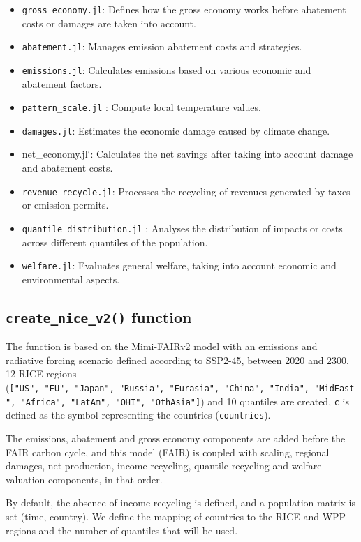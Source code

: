 \documentclass[
]{article}
\begin{document}
\begin{itemize}
\item
  \texttt{gross\_economy.jl}: Defines how the gross economy works before
  abatement costs or damages are taken into account.
\item
  \texttt{abatement.jl}: Manages emission abatement costs and
  strategies.
\item
  \texttt{emissions.jl}: Calculates emissions based on various economic
  and abatement factors.
\item
  \texttt{pattern\_scale.jl} : Compute local temperature values.
\item
  \texttt{damages.jl}: Estimates the economic damage caused by climate
  change.
\item
  net\_economy.jl`: Calculates the net savings after taking into account
  damage and abatement costs.
\item
  \texttt{revenue\_recycle.jl}: Processes the recycling of revenues
  generated by taxes or emission permits.
\item
  \texttt{quantile\_distribution.jl} : Analyses the distribution of
  impacts or costs across different quantiles of the population.
\item
  \texttt{welfare.jl}: Evaluates general welfare, taking into account
  economic and environmental aspects.
\end{itemize}

\subsection{\texorpdfstring{\texttt{create\_nice\_v2()}
function}{create\_nice\_v2() function}}\label{create_nice_v2-function}

The function is based on the Mimi-FAIRv2 model with an emissions and
radiative forcing scenario defined according to SSP2-45, between 2020
and 2300. 12 RICE regions
(\texttt{{[}"US",\ "EU",\ "Japan",\ "Russia",\ "Eurasia",\ "China",\ "India",\ "MidEast",\ "Africa",\ "LatAm",\ "OHI",\ "OthAsia"{]}})
and 10 quantiles are created, \texttt{c} is defined as the symbol
representing the countries (\texttt{countries}).

The emissions, abatement and gross economy components are added before
the FAIR carbon cycle, and this model (FAIR) is coupled with scaling,
regional damages, net production, income recycling, quantile recycling
and welfare valuation components, in that order.

By default, the absence of income recycling is defined, and a population
matrix is set (time, country). We define the mapping of countries to the
RICE and WPP regions and the number of quantiles that will be used.
\end{document}
